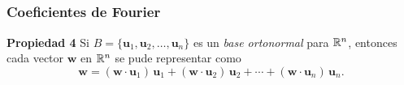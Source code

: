 
\subsection{}

\begin{frame}\frametitle{Coeficientes de Fourier}
	
	\begin{prop}{\textbf{Propiedad 4}}
		\justifying
		Si $B = \{ \mathbf{u}_1, \mathbf{u}_2, \hdots, \mathbf{u}_n\}$ es un \textit{base ortonormal} para $\mathbb{R}^n$, entonces
		cada vector $\mathbf{w}$ en $\mathbb{R}^n$ se pude representar como
		\[
		\mathbf{w} = (\mathbf{w}\cdot \mathbf{u}_1)\, \mathbf{u}_1 + (\mathbf{w}\cdot \mathbf{u}_2)\, \mathbf{u}_2 + \cdots 
		+ (\mathbf{w}\cdot \mathbf{u}_n)\, \mathbf{u}_n.
		\]
		
		\vspace{-1mm}
	\end{prop}		
	
\end{frame}


\subsection{}


